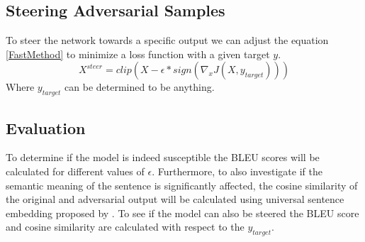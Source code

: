 \subsection*{Steering Adversarial Samples}
To steer the network towards a specific output we can adjust the equation \ref{FastMethod} to minimize a loss function with a given target $y$.
\begin{equation}
    X^{steer} = clip(X - \epsilon * sign(\nabla_{x}J(X, y_{target})))
\end{equation}
Where $y_{target}$ can be determined to be anything.

\subsection*{Evaluation}
To determine if the model is indeed susceptible the BLEU scores will be calculated for different values of $\epsilon$. Furthermore, to also investigate if the semantic meaning of the sentence is significantly affected, the cosine similarity of the original and adversarial output will be calculated using universal sentence embedding proposed by \citeauthor{DBLP:journals/corr/abs-1803-11175}.
To see if the model can also be steered the BLEU score and cosine similarity are calculated with respect to the $y_{target}$.
